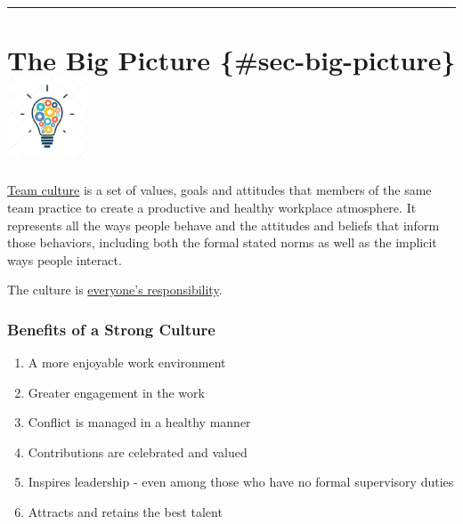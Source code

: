 \documentclass[
  letterpaper,
  DIV=11,
  numbers=noendperiod]{scrreprt}
\providecommand{\tightlist}{%
  \setlength{\itemsep}{0pt}\setlength{\parskip}{0pt}}\usepackage{longtable,booktabs,array}
\begin{document}
\begin{center}\rule{0.5\linewidth}{0.5pt}\end{center}


\chapter[The Big Picture \{\#sec-big-picture\}]{\texorpdfstring{The Big
Picture
\{\#sec-big-picture\}\protect\includegraphics[width=\textwidth,height=0.9375in]{_img/lightbulbicon.jpg}}{The Big Picture \{\#sec-big-picture\}}}\label{the-big-picture-sec-big-picture}

\href{https://www.youtube.com/watch?v=IlH0GgVbhwM}{Team culture} is a
set of values, goals and attitudes that members of the same team
practice to create a productive and healthy workplace atmosphere. It
represents all the ways people behave and the attitudes and beliefs that
inform those behaviors, including both the formal stated norms as well
as the implicit ways people interact.

The culture is
\href{https://www.youtube.com/watch?v=6MEocQzw-54}{everyone's
responsibility}.

\subsection{Benefits of a Strong
Culture}\label{benefits-of-a-strong-culture}

\begin{enumerate}
\def\labelenumi{\arabic{enumi}.}
\tightlist
\item
  A more enjoyable work environment\\
\item
  Greater engagement in the work\\
\item
  Conflict is managed in a healthy manner\\
\item
  Contributions are celebrated and valued\\
\item
  Inspires leadership - even among those who have no formal supervisory
  duties\\
\item
  Attracts and retains the best talent
\end{enumerate}
\end{document}
